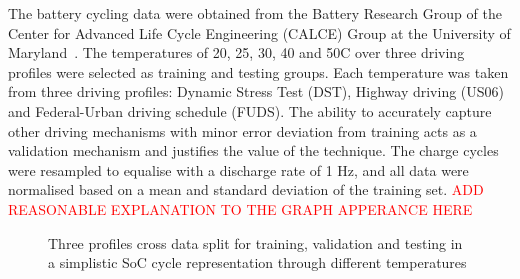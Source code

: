 %
%
{The battery cycling data were obtained from the Battery Research Group of the Center for Advanced Life Cycle Engineering (CALCE) Group at the University of Maryland~\cite{noauthor_calce_2017}.}
The temperatures of 20, 25, 30, 40 and 50\textdegree{}C over three driving profiles were selected as training and testing groups.
Each temperature was taken from three driving profiles: Dynamic Stress Test (DST), Highway driving (US06) and Federal-Urban driving schedule (FUDS).
The ability to accurately capture other driving mechanisms with minor error deviation from training acts as a validation mechanism and justifies the value of the technique.
The charge cycles were resampled to equalise with a discharge rate of 1 Hz, and all data were normalised based on a mean and standard deviation of the training set. \textcolor{red}{ADD REASONABLE EXPLANATION TO THE GRAPH APPERANCE HERE}
\begin{figure}[ht]
    \centering
    
    \caption{Three profiles cross data split for training, validation and testing in a simplistic SoC cycle representation through different temperatures}
    \label{fig:cross-data}
\end{figure}

